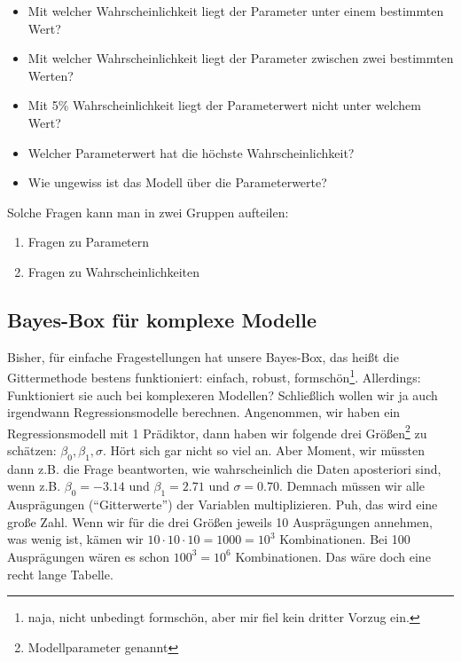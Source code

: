 \documentclass[
  a4paper,
  DIV=11]{scrreprt}
\providecommand{\tightlist}{%
  \setlength{\itemsep}{0pt}\setlength{\parskip}{0pt}}\usepackage{longtable,booktabs,array}
\theoremstyle{definition}
\theoremstyle{remark}
\begin{document}
\begin{itemize}
\tightlist
\item
  Mit welcher Wahrscheinlichkeit liegt der Parameter unter einem
  bestimmten Wert?
\item
  Mit welcher Wahrscheinlichkeit liegt der Parameter zwischen zwei
  bestimmten Werten?
\item
  Mit 5\% Wahrscheinlichkeit liegt der Parameterwert nicht unter welchem
  Wert?
\item
  Welcher Parameterwert hat die höchste Wahrscheinlichkeit?
\item
  Wie ungewiss ist das Modell über die Parameterwerte?
\end{itemize}

Solche Fragen kann man in zwei Gruppen aufteilen:

\begin{enumerate}
\def\labelenumi{\arabic{enumi}.}
\tightlist
\item
  Fragen zu Parametern
\item
  Fragen zu Wahrscheinlichkeiten
\end{enumerate}

\hypertarget{bayes-box-fuxfcr-komplexe-modelle}{%
\subsection{Bayes-Box für komplexe
Modelle}\label{bayes-box-fuxfcr-komplexe-modelle}}

Bisher, für einfache Fragestellungen hat unsere Bayes-Box, das heißt die
Gittermethode bestens funktioniert: einfach, robust,
formschön\footnote{naja, nicht unbedingt formschön, aber mir fiel kein
  dritter Vorzug ein.}. Allerdings: Funktioniert sie auch bei
komplexeren Modellen? Schließlich wollen wir ja auch irgendwann
Regressionsmodelle berechnen. Angenommen, wir haben ein
Regressionsmodell mit 1 Prädiktor, dann haben wir folgende drei
Größen\footnote{Modellparameter genannt} zu schätzen:
\(\beta_0, \beta_1, \sigma\). Hört sich gar nicht so viel an. Aber
Moment, wir müssten dann z.B. die Frage beantworten, wie wahrscheinlich
die Daten aposteriori sind, wenn z.B. \(\beta_0 = -3.14\) und
\(\beta_1 = 2.71\) und \(\sigma = 0.70\). Demnach müssen wir alle
Ausprägungen (``Gitterwerte'') der Variablen multiplizieren. Puh, das
wird eine große Zahl. Wenn wir für die drei Größen jeweils 10
Ausprägungen annehmen, was wenig ist, kämen wir
\(10\cdot10\cdot10= 1000=10^3\) Kombinationen. Bei 100 Ausprägungen
wären es schon \(100^3=10^6\) Kombinationen. Das wäre doch eine recht
lange Tabelle.
\end{document}
